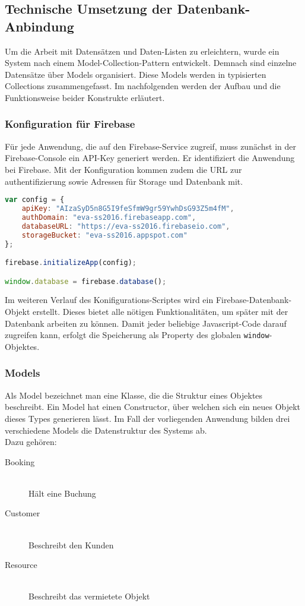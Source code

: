 \subsection{Technische Umsetzung der Datenbank-Anbindung}
Um die Arbeit mit Datensätzen und Daten-Listen zu erleichtern, wurde ein System nach einem Model-Collection-Pattern entwickelt.
Demnach sind einzelne Datensätze über Models organisiert. Diese Models werden in typisierten Collections zusammengefasst.
Im nachfolgenden werden der Aufbau und die Funktionsweise beider Konstrukte erläutert.

\subsubsection{Konfiguration für Firebase}

Für jede Anwendung, die auf den Firebase-Service zugreif, muss zunächst in der Firebase-Console ein API-Key generiert werden. Er identifiziert die Anwendung bei Firebase.
Mit der Konfiguration kommen zudem die URL zur authentifizierung sowie Adressen für Storage und Datenbank mit.

\begin{lstlisting}[language=Javascript, label=code_APIConfig, caption=Konfiguration des Frontends]
var config = {
    apiKey: "AIzaSyD5n8G5I9feSfmW9gr59YwhDsG93Z5m4fM",
    authDomain: "eva-ss2016.firebaseapp.com",
    databaseURL: "https://eva-ss2016.firebaseio.com",
    storageBucket: "eva-ss2016.appspot.com"
};

firebase.initializeApp(config);

window.database = firebase.database();
\end{lstlisting}

Im weiteren Verlauf des Konifigurations-Scriptes wird ein Firebase-Datenbank-Objekt erstellt. Dieses bietet alle nötigen Funktionalitäten, um später mit der Datenbank arbeiten zu können.
Damit jeder beliebige Javascript-Code darauf zugreifen kann, erfolgt die Speicherung als Property des globalen \texttt{window}-Objektes.

\subsubsection{Models}

Als Model bezeichnet man eine Klasse, die die Struktur eines Objektes beschreibt. Ein Model hat einen Constructor, über welchen sich ein neues Objekt dieses Types generieren lässt.
Im Fall der vorliegenden Anwendung bilden drei verschiedene Models die Datenstruktur des Systems ab.\\
Dazu gehören:
\begin{description}
\item[Booking]\hfill \\
Hält eine Buchung
\item[Customer]\hfill \\
Beschreibt den Kunden
\item[Resource]\hfill \\
Beschreibt das vermietete Objekt
\end{description}

